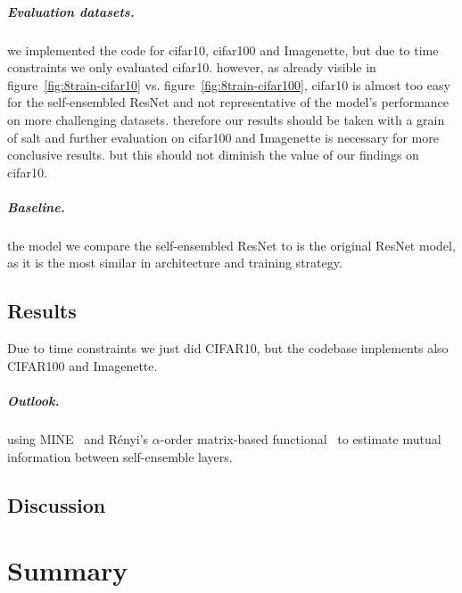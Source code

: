 \documentclass[a4paper, oneside]{discothesis}
\begin{document}
\paragraph{Evaluation datasets.}

we implemented the code for cifar10, cifar100 and Imagenette, but due to time constraints we only evaluated cifar10. however, as already visible in figure~\ref{fig:8train-cifar10} vs. figure~\ref{fig:8train-cifar100}, cifar10 is almost too easy for the self-ensembled ResNet and not representative of the model's performance on more challenging datasets. therefore our results should be taken with a grain of salt and further evaluation on cifar100 and Imagenette is necessary for more conclusive results. but this should not diminish the value of our findings on cifar10.

\paragraph{Baseline.}

the model we compare the self-ensembled ResNet to is the original ResNet model, as it is the most similar in architecture and training strategy.

\section{Results}

Due to time constraints we just did CIFAR10, but the codebase implements also CIFAR100 and Imagenette.

\paragraph{Outlook.}

using MINE~\cite{pmlr-v80-belghazi18a} and Rényi's $\alpha$-order matrix-based functional~\cite{6954500} to estimate mutual information between self-ensemble layers.







\section{Discussion}

\chapter{Summary}
\end{document}
